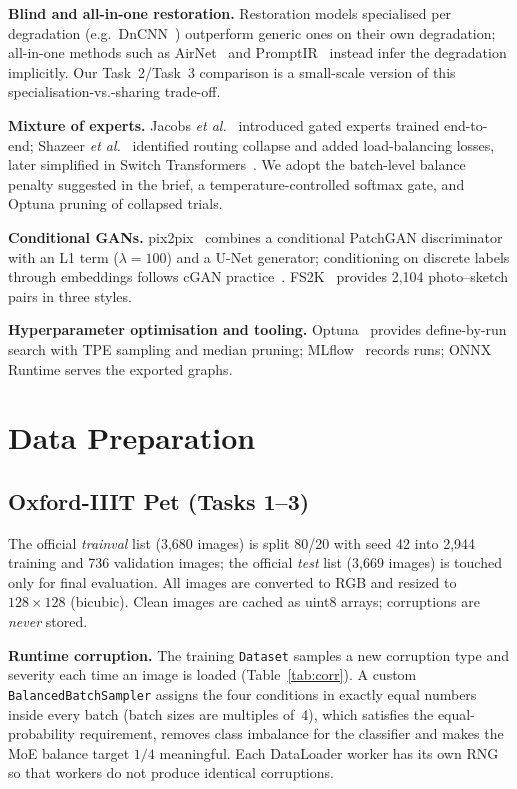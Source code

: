 \documentclass[conference]{IEEEtran}
\begin{document}
\textbf{Blind and all-in-one restoration.} Restoration models specialised per degradation (e.g.\ DnCNN~\cite{zhang2017}) outperform generic ones on their own degradation; all-in-one methods such as AirNet~\cite{li2022airnet} and PromptIR~\cite{potlapalli2023} instead infer the degradation implicitly. Our Task~2/Task~3 comparison is a small-scale version of this specialisation-vs.-sharing trade-off.

\textbf{Mixture of experts.} Jacobs \emph{et al.}~\cite{jacobs1991} introduced gated experts trained end-to-end; Shazeer \emph{et al.}~\cite{shazeer2017} identified routing collapse and added load-balancing losses, later simplified in Switch Transformers~\cite{fedus2022}. We adopt the batch-level balance penalty suggested in the brief, a temperature-controlled softmax gate, and Optuna pruning of collapsed trials.

\textbf{Conditional GANs.} pix2pix~\cite{isola2017} combines a conditional PatchGAN discriminator with an L1 term ($\lambda{=}100$) and a U-Net generator; conditioning on discrete labels through embeddings follows cGAN practice~\cite{mirza2014}. FS2K~\cite{fan2022fs2k} provides 2,104 photo--sketch pairs in three styles.

\textbf{Hyperparameter optimisation and tooling.} Optuna~\cite{akiba2019} provides define-by-run search with TPE sampling and median pruning; MLflow~\cite{zaharia2018} records runs; ONNX Runtime serves the exported graphs.

\section{Data Preparation}
\subsection{Oxford-IIIT Pet (Tasks 1--3)}
The official \emph{trainval} list (3,680 images) is split 80/20 with seed 42 into 2,944 training and 736 validation images; the official \emph{test} list (3,669 images) is touched only for final evaluation. All images are converted to RGB and resized to $128{\times}128$ (bicubic). Clean images are cached as uint8 arrays; corruptions are \emph{never} stored.

\textbf{Runtime corruption.} The training \texttt{Dataset} samples a new corruption type and severity each time an image is loaded (Table~\ref{tab:corr}). A custom \texttt{BalancedBatchSampler} assigns the four conditions in exactly equal numbers inside every batch (batch sizes are multiples of~4), which satisfies the equal-probability requirement, removes class imbalance for the classifier and makes the MoE balance target $1/4$ meaningful. Each DataLoader worker has its own RNG so that workers do not produce identical corruptions.
\end{document}
